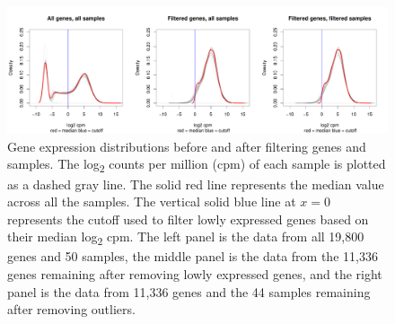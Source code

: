 \documentclass[fleqn,10pt]{wlscirep}
\begin{document}
\begin{figure}[ht]
\centering
\includegraphics[width=\linewidth]{../figure/gene-exp-distribution.pdf}
\caption{
Gene expression distributions before and after filtering genes and
samples. The log\textsubscript{2} counts per million (cpm) of each
sample is plotted as a dashed gray line. The solid red line represents
the median value across all the samples. The vertical solid blue line
at $x = 0$ represents the cutoff used to filter lowly expressed genes
based on their median log\textsubscript{2} cpm. The left panel is the
data from all 19,800 genes and 50 samples, the middle panel is the
data from the 11,336 genes remaining after removing lowly expressed
genes, and the right panel is the data from 11,336 genes and the 44
samples remaining after removing outliers.
}
\label{fig:gene}
\end{figure}
\end{document}
